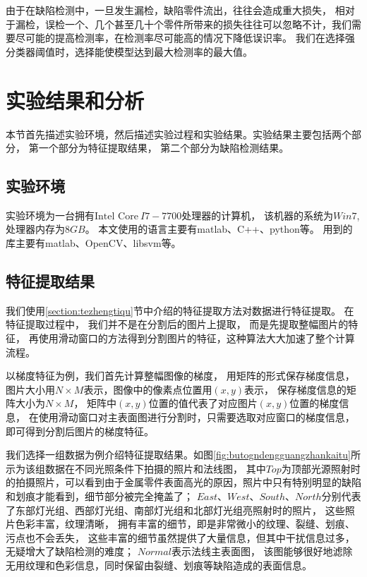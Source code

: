 由于在缺陷检测中，一旦发生漏检，缺陷零件流出，往往会造成重大损失，
相对于漏检，误检一个、几个甚至几十个零件所带来的损失往往可以忽略不计，我们需要尽可能的提高检测率，在检测率尽可能高的情况下降低误识率。
我们在选择强分类器阈值时，选择能使模型达到最大检测率的最大值。


\section{实验结果和分析}
\label{section:shiyanjieguo}

本节首先描述实验环境，然后描述实验过程和实验结果。实验结果主要包括两个部分，
第一个部分为特征提取结果，
第二个部分为缺陷检测结果。

\subsection{实验环境}

实验环境为一台拥有$\mbox{Intel Core}
~I7-7700$处理器的计算机，
该机器的系统为$Win7$,
处理器内存为$8GB$。
本文使用的语言主要有matlab\cite{MATLAB:2017}、C++、python等。
用到的库主要有matlab\cite{MATLAB:2017}、OpenCV\cite{opencv_library}、libsvm\cite{CC01a}等。

\subsection{特征提取结果}

我们使用\ref{section:tezhengtiqu}节中介绍的特征提取方法对数据进行特征提取。
在特征提取过程中，
我们并不是在分割后的图片上提取，
而是先提取整幅图片的特征，
再使用滑动窗口的方法得到分割图片的特征，这种算法大大加速了整个计算流程。

以梯度特征为例，我们首先计算整幅图像的梯度，
用矩阵的形式保存梯度信息，
图片大小用$N\times M$表示，图像中的像素点位置用$(x,y)$表示，
保存梯度信息的矩阵大小为$N\times M$，
矩阵中$(x,y)$位置的值代表了对应图片$(x,y)$位置的梯度信息，
在使用滑动窗口对主表面图进行分割时，只需要选取对应窗口的梯度信息，
即可得到分割后图片的梯度特征。

我们选择一组数据为例介绍特征提取结果。如图\ref{fig:butogndengguangzhankaitu}所示为该组数据在不同光照条件下拍摄的照片和法线图，
其中$Top$为顶部光源照射时的拍摄照片，可以看到由于金属零件表面高光的原因，照片中只有特别明显的缺陷和划痕才能看到，细节部分被完全掩盖了；
$East$、$West$、$South$、$North$分别代表了东部灯光组、西部灯光组、南部灯光组和北部灯光组亮照射时的照片，
这些照片色彩丰富，纹理清晰，
拥有丰富的细节，即是非常微小的纹理、裂缝、划痕、污点也不会丢失，
这些丰富的细节虽然提供了大量信息，但其中干扰信息过多，无疑增大了缺陷检测的难度；
$Normal$表示法线主表面图，
该图能够很好地滤除无用纹理和色彩信息，同时保留由裂缝、划痕等缺陷造成的表面信息。

